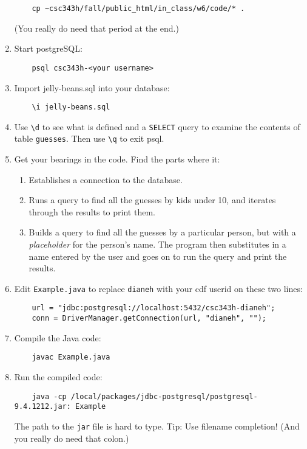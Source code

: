 \documentclass[11pt]{article}
\begin{document}
\begin{enumerate}
\begin{verbatim}
    cp ~csc343h/fall/public_html/in_class/w6/code/* .
\end{verbatim}
(You really do need that period at the end.)
\item  %
Start postgreSQL: 
\begin{verbatim}
    psql csc343h-<your username>
\end{verbatim}
\item  %
Import jelly-beans.sql into your database:
\begin{verbatim}
    \i jelly-beans.sql
\end{verbatim}
\item  %
Use \verb+\d+ to see what is defined and a \verb+SELECT+ query to examine the contents of 
table \verb+guesses+.
Then use \verb+\q+ to exit psql.
\item  %
Get your bearings in the code.  Find the parts where it:
\begin{enumerate}
\item
Establishes a connection to the database.
\item
Runs a query to find all the guesses by kids under 10, and iterates through the results to print them.
\item
Builds a query to find all the guesses by a particular person, but with a {\it placeholder} for
the person's name.  The program then substitutes in a name entered by the user and goes on to
run the query and print the results.
\end{enumerate}
\item  %
Edit \verb+Example.java+ to replace \verb+dianeh+ with your cdf userid on these two lines: 
\begin{verbatim}
    url = "jdbc:postgresql://localhost:5432/csc343h-dianeh";
    conn = DriverManager.getConnection(url, "dianeh", "");
\end{verbatim}
\item  %
Compile the Java code:
\begin{verbatim}
    javac Example.java
\end{verbatim}
\item  %
Run the compiled code:
\begin{verbatim}
    java -cp /local/packages/jdbc-postgresql/postgresql-9.4.1212.jar: Example
\end{verbatim}
The path to the \verb+jar+ file is hard to type.
Tip: Use filename completion!
(And you really do need that colon.)
\end{enumerate}
\end{document}

